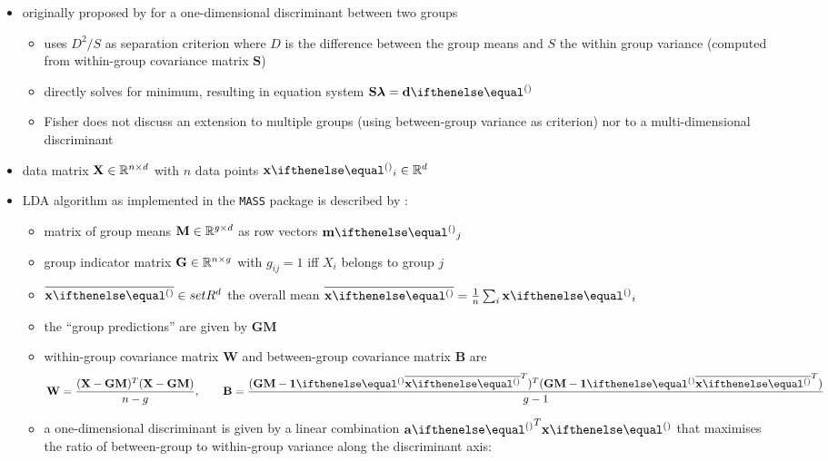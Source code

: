 \documentclass[a4paper]{article}
\begin{document}
\begin{itemize}
\item originally proposed by \citet{Fisher:36} for a one-dimensional discriminant between two groups
  \begin{itemize}
  \item uses $D^2 / S$ as separation criterion where $D$ is the difference between the group means and $S$ the within group variance (computed from within-group covariance matrix $\mathbf{S}$)
  \item directly solves for minimum, resulting in equation system $\mathbf{S} \boldsymbol{\lambda} = \vd$
  \item Fisher does not discuss an extension to multiple groups (using between-group variance as criterion) nor to a multi-dimensional discriminant
  \end{itemize}
\item data matrix $\mathbf{X}\in \mathbb{R}^{n\times d}$ with $n$ data points $\vx_i\in \setR^d$
\item LDA algorithm as implemented in the \texttt{MASS} package is described by \citet[331--332]{Venables:Ripley:02}:
  \begin{itemize}
  \item matrix of group means $\mathbf{M}\in \mathbb{R}^{g\times d}$ as row vectors $\vm_j$
  \item group indicator matrix $\mathbf{G}\in \mathbb{R}^{n\times g}$ with $g_{ij} = 1$ iff $X_i$ belongs to group $j$
  \item $\overline{\vx}\in setR^d$ the overall mean $\overline{\vx} = \frac1n \sum_i \vx_i$
  \item the ``group predictions'' are given by $\mathbf{G}\mathbf{M}$
  \item within-group covariance matrix $\mathbf{W}$ and between-group covariance matrix $\mathbf{B}$ are
    \begin{equation}
      \label{eq:lda:mass-W-B}
      \mathbf{W} = \frac{
        (\mathbf{X} - \mathbf{GM})^T (\mathbf{X} - \mathbf{GM})
      }{ n - g }
      ,\qquad
      \mathbf{B} = \frac{
        (\mathbf{GM} - \vone \overline{\vx}^T)^T (\mathbf{GM} - \vone \overline{\vx}^T)
      }{g - 1}
    \end{equation}
  \item a one-dimensional discriminant is given by a linear combination $\va^T \vx$ that maximises the ratio of between-group to within-group variance along the discriminant axis:
    \begin{equation}
      \label{eq:lda:mass-criterion}

\end{equation}
\end{itemize}
\end{itemize}
\end{document}
